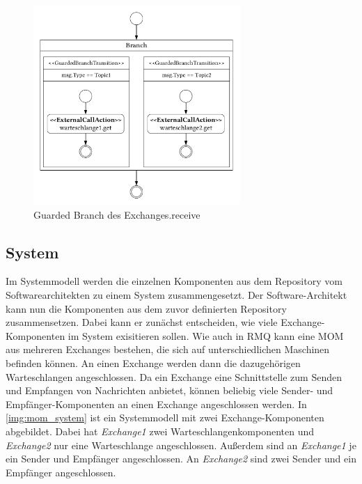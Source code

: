 \begin{figure}
\center
  \includegraphics[width=0.7\textwidth]{images/modelling/modelingGuardedBranch.pdf}
  \caption{Guarded Branch des Exchanges.receive}
  \label{img:queueBranch}
\end{figure}

\subsection{System}
Im Systemmodell werden die einzelnen Komponenten aus dem Repository vom Softwarearchitekten zu einem System zusammengesetzt. Der Software-Architekt kann nun die Komponenten aus dem zuvor definierten Repository zusammensetzen. Dabei kann er zunächst entscheiden, wie viele Exchange-Komponenten im System exisitieren sollen. Wie auch in RMQ kann eine MOM aus mehreren Exchanges bestehen, die sich auf unterschiedlichen Maschinen befinden können. An einen Exchange werden dann die dazugehörigen Warteschlangen angeschlossen. Da ein Exchange eine Schnittstelle zum Senden und Empfangen von Nachrichten anbietet, können beliebig viele Sender- und Empfänger-Komponenten an einen Exchange angeschlossen werden. In \autoref{img:mom_system} ist ein Systemmodell mit zwei Exchange-Komponenten abgebildet. Dabei hat \emph{Exchange1} zwei Warteschlangenkomponenten und \emph{Exchange2} nur eine Warteschlange angeschlossen. Außerdem sind an \emph{Exchange1} je ein Sender und Empfänger angeschlossen. An \emph{Exchange2} sind zwei Sender und ein Empfänger angeschlossen. 

